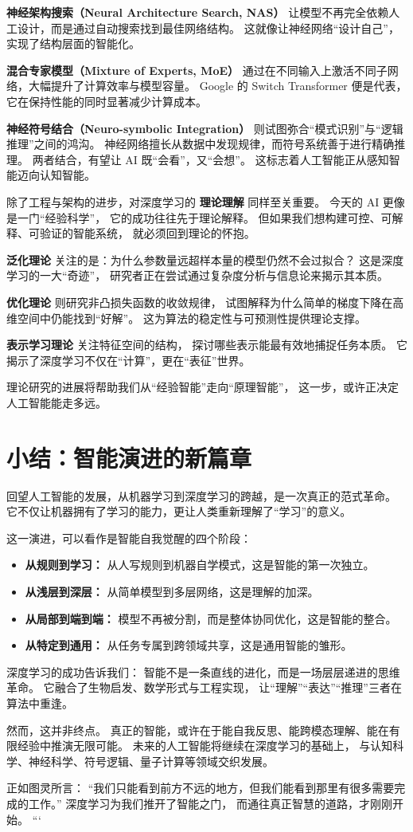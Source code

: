 {\bf 神经架构搜索（Neural Architecture Search, NAS）}  
让模型不再完全依赖人工设计，而是通过自动搜索找到最佳网络结构。  
这就像让神经网络“设计自己”，实现了结构层面的智能化。  

{\bf 混合专家模型（Mixture of Experts, MoE）}  
通过在不同输入上激活不同子网络，大幅提升了计算效率与模型容量。  
Google 的 Switch Transformer 便是代表，它在保持性能的同时显著减少计算成本。  

{\bf 神经符号结合（Neuro-symbolic Integration）}  
则试图弥合“模式识别”与“逻辑推理”之间的鸿沟。  
神经网络擅长从数据中发现规律，而符号系统善于进行精确推理。  
两者结合，有望让 AI 既“会看”，又“会想”。  
这标志着人工智能正从感知智能迈向认知智能。

除了工程与架构的进步，对深度学习的 {\bf 理论理解} 同样至关重要。  
今天的 AI 更像是一门“经验科学”，  
它的成功往往先于理论解释。  
但如果我们想构建可控、可解释、可验证的智能系统，  
就必须回到理论的怀抱。  

{\bf 泛化理论} 关注的是：为什么参数量远超样本量的模型仍然不会过拟合？  
这是深度学习的一大“奇迹”，  
研究者正在尝试通过复杂度分析与信息论来揭示其本质。  

{\bf 优化理论} 则研究非凸损失函数的收敛规律，  
试图解释为什么简单的梯度下降在高维空间中仍能找到“好解”。  
这为算法的稳定性与可预测性提供理论支撑。  

{\bf 表示学习理论} 关注特征空间的结构，  
探讨哪些表示能最有效地捕捉任务本质。  
它揭示了深度学习不仅在“计算”，更在“表征”世界。  

理论研究的进展将帮助我们从“经验智能”走向“原理智能”，  
这一步，或许正决定人工智能能走多远。

\section{小结：智能演进的新篇章}

回望人工智能的发展，从机器学习到深度学习的跨越，是一次真正的范式革命。  
它不仅让机器拥有了学习的能力，更让人类重新理解了“学习”的意义。  

这一演进，可以看作是智能自我觉醒的四个阶段：  
\begin{itemize}
\item {\bf 从规则到学习：} 从人写规则到机器自学模式，这是智能的第一次独立。  
\item {\bf 从浅层到深层：} 从简单模型到多层网络，这是理解的加深。  
\item {\bf 从局部到端到端：} 模型不再被分割，而是整体协同优化，这是智能的整合。  
\item {\bf 从特定到通用：} 从任务专属到跨领域共享，这是通用智能的雏形。  
\end{itemize}

深度学习的成功告诉我们：  
智能不是一条直线的进化，而是一场层层递进的思维革命。  
它融合了生物启发、数学形式与工程实现，  
让“理解”“表达”“推理”三者在算法中重逢。  

然而，这并非终点。  
真正的智能，或许在于能自我反思、能跨模态理解、能在有限经验中推演无限可能。  
未来的人工智能将继续在深度学习的基础上，  
与认知科学、神经科学、符号逻辑、量子计算等领域交织发展。  

正如图灵所言：  
“我们只能看到前方不远的地方，但我们能看到那里有很多需要完成的工作。”  
深度学习为我们推开了智能之门，  
而通往真正智慧的道路，才刚刚开始。
```
